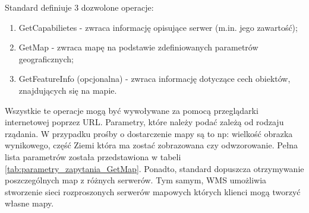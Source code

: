 Standard definiuje 3 dozwolone operacje: 
\begin{enumerate}
    \item GetCapabilietes - zwraca informację opisujące serwer (m.in. jego zawartość);
    \item GetMap - zwraca mapę na podstawie zdefiniowanych parametrów geograficznych;
    \item GetFeatureInfo (opcjonalna) - zwraca informację dotyczące cech obiektów, znajdujących się na mapie.
\end{enumerate}
Wszystkie te operacje mogą być wywoływane za pomocą przeglądarki internetowej poprzez URL. Parametry, które należy podać zależą od rodzaju rządania.
W przypadku prośby o dostarczenie mapy są to np: wielkość obrazka wynikowego, część Ziemi która ma zostać zobrazowana czy odwzorowanie. Pełna lista parametrów
została przedstawiona w tabeli \ref{tab:parametry_zapytania_GetMap}. Ponadto, standard dopuszcza otrzymywanie poszczególnych map z różnych serwerów.
Tym samym, WMS umożliwia stworzenie sieci rozproszonych serwerów mapowych których klienci mogą tworzyć własne mapy.

